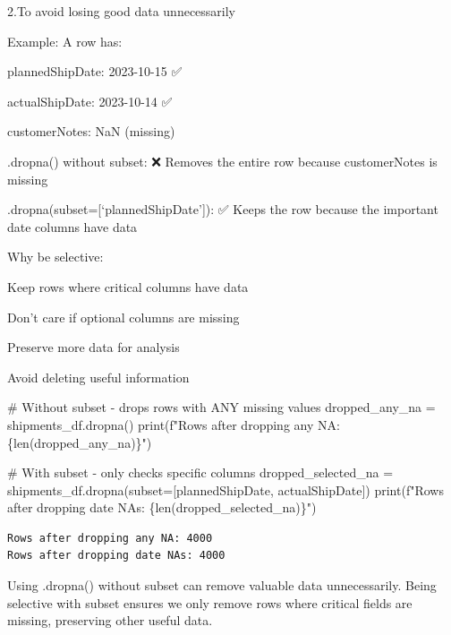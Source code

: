 \documentclass[
  letterpaper,
  DIV=11,
  numbers=noendperiod]{scrartcl}
\newenvironment{Shaded}{\begin{snugshade}}{\end{snugshade}}
\newcommand{\BuiltInTok}[1]{\textcolor[rgb]{0.00,0.23,0.31}{#1}}
\newcommand{\CommentTok}[1]{\textcolor[rgb]{0.37,0.37,0.37}{#1}}
\newcommand{\NormalTok}[1]{\textcolor[rgb]{0.00,0.23,0.31}{#1}}
\newcommand{\OperatorTok}[1]{\textcolor[rgb]{0.37,0.37,0.37}{#1}}
\newcommand{\SpecialCharTok}[1]{\textcolor[rgb]{0.37,0.37,0.37}{#1}}
\newcommand{\SpecialStringTok}[1]{\textcolor[rgb]{0.13,0.47,0.30}{#1}}
\newcommand{\StringTok}[1]{\textcolor[rgb]{0.13,0.47,0.30}{#1}}
\begin{document}
2.To avoid losing good data unnecessarily

Example: A row has:

plannedShipDate: 2023-10-15 ✅

actualShipDate: 2023-10-14 ✅

customerNotes: NaN (missing)

.dropna() without subset: ❌ Removes the entire row because
customerNotes is missing

.dropna(subset={[}`plannedShipDate'{]}): ✅ Keeps the row because the
important date columns have data

Why be selective:

Keep rows where critical columns have data

Don't care if optional columns are missing

Preserve more data for analysis

Avoid deleting useful information

\begin{Shaded}
\begin{Highlighting}[]
\CommentTok{\# Without subset {-} drops rows with ANY missing values}
\NormalTok{dropped\_any\_na }\OperatorTok{=}\NormalTok{ shipments\_df.dropna()}
\BuiltInTok{print}\NormalTok{(}\SpecialStringTok{f"Rows after dropping any NA: }\SpecialCharTok{\{}\BuiltInTok{len}\NormalTok{(dropped\_any\_na)}\SpecialCharTok{\}}\SpecialStringTok{"}\NormalTok{)}

\CommentTok{\# With subset {-} only checks specific columns}
\NormalTok{dropped\_selected\_na }\OperatorTok{=}\NormalTok{ shipments\_df.dropna(subset}\OperatorTok{=}\NormalTok{[}\StringTok{\textquotesingle{}plannedShipDate\textquotesingle{}}\NormalTok{, }\StringTok{\textquotesingle{}actualShipDate\textquotesingle{}}\NormalTok{])}
\BuiltInTok{print}\NormalTok{(}\SpecialStringTok{f"Rows after dropping date NAs: }\SpecialCharTok{\{}\BuiltInTok{len}\NormalTok{(dropped\_selected\_na)}\SpecialCharTok{\}}\SpecialStringTok{"}\NormalTok{)}
\end{Highlighting}
\end{Shaded}

\begin{verbatim}
Rows after dropping any NA: 4000
Rows after dropping date NAs: 4000
\end{verbatim}

Using .dropna() without subset can remove valuable data unnecessarily.
Being selective with subset ensures we only remove rows where critical
fields are missing, preserving other useful data.
\end{document}
